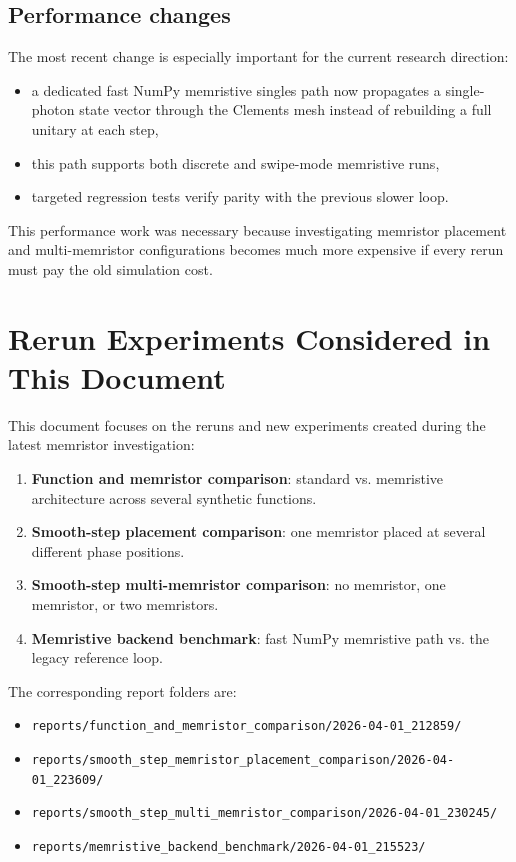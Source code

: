 \documentclass[11pt,a4paper]{article}
\begin{document}
\subsection{Performance changes}
The most recent change is especially important for the current research direction:
\begin{itemize}[leftmargin=*]
    \item a dedicated fast NumPy memristive singles path now propagates a single-photon state vector through the Clements mesh instead of rebuilding a full unitary at each step,
    \item this path supports both discrete and swipe-mode memristive runs,
    \item targeted regression tests verify parity with the previous slower loop.
\end{itemize}

This performance work was necessary because investigating memristor placement and multi-memristor configurations becomes much more expensive if every rerun must pay the old simulation cost.

\section{Rerun Experiments Considered in This Document}

This document focuses on the reruns and new experiments created during the latest memristor investigation:
\begin{enumerate}[leftmargin=*]
    \item \textbf{Function and memristor comparison}: standard vs. memristive architecture across several synthetic functions.
    \item \textbf{Smooth-step placement comparison}: one memristor placed at several different phase positions.
    \item \textbf{Smooth-step multi-memristor comparison}: no memristor, one memristor, or two memristors.
    \item \textbf{Memristive backend benchmark}: fast NumPy memristive path vs. the legacy reference loop.
\end{enumerate}

The corresponding report folders are:
\begin{itemize}[leftmargin=*]
    \item \texttt{reports/function\_and\_memristor\_comparison/2026-04-01\_212859/}
    \item \texttt{reports/smooth\_step\_memristor\_placement\_comparison/2026-04-01\_223609/}
    \item \texttt{reports/smooth\_step\_multi\_memristor\_comparison/2026-04-01\_230245/}
    \item \texttt{reports/memristive\_backend\_benchmark/2026-04-01\_215523/}
\end{itemize}
\end{document}
